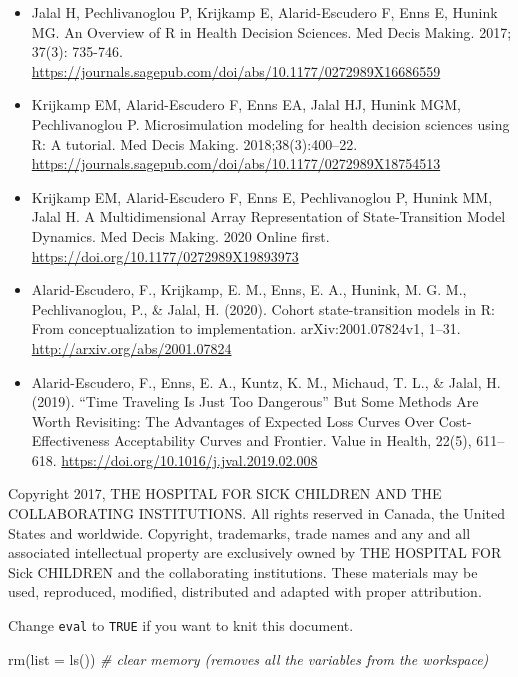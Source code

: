 \documentclass[
]{article}
\newenvironment{Shaded}{\begin{snugshade}}{\end{snugshade}}
\newcommand{\AttributeTok}[1]{\textcolor[rgb]{0.77,0.63,0.00}{#1}}
\newcommand{\CommentTok}[1]{\textcolor[rgb]{0.56,0.35,0.01}{\textit{#1}}}
\newcommand{\FunctionTok}[1]{\textcolor[rgb]{0.00,0.00,0.00}{#1}}
\newcommand{\NormalTok}[1]{#1}
\begin{document}
\begin{itemize}
\item
  Jalal H, Pechlivanoglou P, Krijkamp E, Alarid-Escudero F, Enns E,
  Hunink MG. An Overview of R in Health Decision Sciences. Med Decis
  Making. 2017; 37(3): 735-746.
  \url{https://journals.sagepub.com/doi/abs/10.1177/0272989X16686559}
\item
  Krijkamp EM, Alarid-Escudero F, Enns EA, Jalal HJ, Hunink MGM,
  Pechlivanoglou P. Microsimulation modeling for health decision
  sciences using R: A tutorial. Med Decis Making. 2018;38(3):400--22.
  \url{https://journals.sagepub.com/doi/abs/10.1177/0272989X18754513}
\item
  Krijkamp EM, Alarid-Escudero F, Enns E, Pechlivanoglou P, Hunink MM,
  Jalal H. A Multidimensional Array Representation of State-Transition
  Model Dynamics. Med Decis Making. 2020 Online first.
  \url{https://doi.org/10.1177/0272989X19893973}
\item
  Alarid-Escudero, F., Krijkamp, E. M., Enns, E. A., Hunink, M. G. M.,
  Pechlivanoglou, P., \& Jalal, H. (2020). Cohort state-transition
  models in R: From conceptualization to implementation.
  arXiv:2001.07824v1, 1--31. \url{http://arxiv.org/abs/2001.07824}
\item
  Alarid-Escudero, F., Enns, E. A., Kuntz, K. M., Michaud, T. L., \&
  Jalal, H. (2019). ``Time Traveling Is Just Too Dangerous'' But Some
  Methods Are Worth Revisiting: The Advantages of Expected Loss Curves
  Over Cost-Effectiveness Acceptability Curves and Frontier. Value in
  Health, 22(5), 611--618.
  \url{https://doi.org/10.1016/j.jval.2019.02.008}
\end{itemize}

Copyright 2017, THE HOSPITAL FOR SICK CHILDREN AND THE COLLABORATING
INSTITUTIONS. All rights reserved in Canada, the United States and
worldwide. Copyright, trademarks, trade names and any and all associated
intellectual property are exclusively owned by THE HOSPITAL FOR Sick
CHILDREN and the collaborating institutions. These materials may be
used, reproduced, modified, distributed and adapted with proper
attribution.

\newpage

Change \texttt{eval} to \texttt{TRUE} if you want to knit this document.

\begin{Shaded}
\begin{Highlighting}[]
\FunctionTok{rm}\NormalTok{(}\AttributeTok{list =} \FunctionTok{ls}\NormalTok{())      }\CommentTok{\# clear memory (removes all the variables from the workspace)}
\end{Highlighting}
\end{Shaded}
\end{document}
